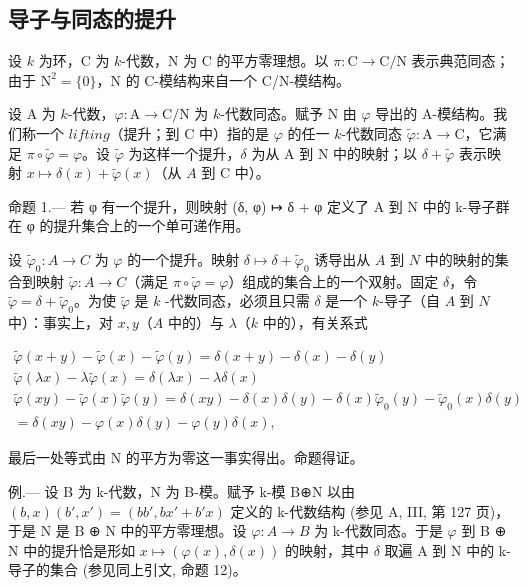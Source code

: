 \subsection{导子与同态的提升}

设 \(k\) 为环，C 为 \(k\)-代数，N 为 C 的平方零理想。以 \(\pi : \mathrm{C} \to \mathrm{C/N}\) 表示典范同态；由于 \(\mathrm{N}^2 = \{0\}\)，N 的 C-模结构来自一个 C/N-模结构。

设 A 为 \(k\)-代数，\(\varphi : \mathrm{A} \to \mathrm{C/N}\) 为 \(k\)-代数同态。赋予 N 由 \(\varphi\) 导出的 A-模结构。我们称一个 \(lifting\)（提升；到 C 中）指的是 \(\varphi\) 的任一 \(k\)-代数同态 \(\tilde{\varphi} : \mathrm{A} \to \mathrm{C}\)，它满足 \(\pi \circ \tilde{\varphi} = \varphi\)。设 \(\tilde{\varphi}\) 为这样一个提升，\(\delta\) 为从 A 到 N 中的映射；以 \(\delta + \tilde{\varphi}\) 表示映射 \(x \mapsto \delta(x) + \tilde{\varphi}(x)\)（从 \(A\) 到 C 中）。

命题 1.--- 若 φ 有一个提升，则映射 (δ, φ) ↦ δ + φ 定义了 A 到 N 中的 k-导子群在 φ 的提升集合上的一个单可递作用。

设 \(\tilde{\varphi}_{0}: A \to C\) 为 \(\varphi\) 的一个提升。映射 \(\delta \mapsto \delta + \tilde{\varphi}_{0}\) 诱导出从 \(A\) 到 \(N\) 中的映射的集合到映射 \(\tilde{\varphi}: A \to C\)（满足 \(\pi \circ \tilde{\varphi} = \varphi\)）组成的集合上的一个双射。固定 \(\delta\)，令 \(\tilde{\varphi} = \delta + \tilde{\varphi}_{0}\)。为使 \(\tilde{\varphi}\) 是 \(k\) -代数同态，必须且只需 \(\delta\) 是一个 \(k\)-导子（自 \(A\) 到 \(N\) 中）：事实上，对 \(x, y\)（\(A\) 中的）与 \(\lambda\)（\(k\) 中的），有关系式

\[
\begin{array}{c} \tilde {\varphi} (x + y) - \tilde {\varphi} (x) - \tilde {\varphi} (y) = \delta (x + y) - \delta (x) - \delta (y) \\ \tilde {\varphi} (\lambda x) - \lambda \tilde {\varphi} (x) = \delta (\lambda x) - \lambda \delta (x) \\ \tilde {\varphi} (x y) - \tilde {\varphi} (x) \tilde {\varphi} (y) = \delta (x y) - \delta (x) \delta (y) - \delta (x) \tilde {\varphi} _ {0} (y) - \tilde {\varphi} _ {0} (x) \delta (y) \\ = \delta (x y) - \varphi (x) \delta (y) - \varphi (y) \delta (x), \end{array}
\]

最后一处等式由 N 的平方为零这一事实得出。命题得证。

例.--- 设 B 为 k-代数，N 为 B-模。赋予 k-模 B⊕N 以由 \((b,x)(b',x') = (bb',bx' + b'x)\) 定义的 k-代数结构 (参见 A, III, 第 127 页)，于是 N 是 B ⊕ N 中的平方零理想。设 \(\varphi : A \to B\) 为 k-代数同态。于是 \(\varphi\) 到 B ⊕ N 中的提升恰是形如 \(x \mapsto (\varphi(x), \delta(x))\) 的映射，其中 \(\delta\) 取遍 A 到 N 中的 k-导子的集合 (参见同上引文, 命题 12)。

